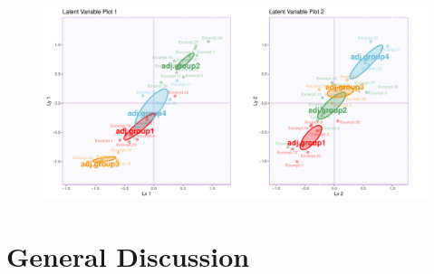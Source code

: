 \documentclass[
  english,
  man,floatsintext]{apa6}
\begin{document}
\begin{figure}

{\centering \includegraphics{Music-Descriptor-Space_files/figure-latex/factorplotsPLSC-1} 

}

\caption{ }\label{fig:factorplotsPLSC}
\end{figure}

\hypertarget{general-discussion}{%
\section{General Discussion}\label{general-discussion}}
\end{document}
